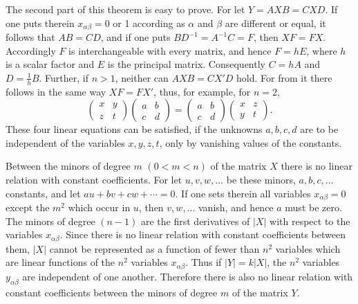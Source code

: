 \documentclass[11pt]{article}
\begin{document}
The second part of this theorem is easy to prove. For let $Y=AXB=CXD$. If one puts therein $x_{\alpha\beta}=0$ or 1 according as $\alpha$ and $\beta$ are different or equal, it follows that $AB=CD$, and if one puts $BD^{-1}=A^{-1}C=F$, then $XF=FX$. Accordingly $F$ is interchangeable with every matrix, and hence $F=hE$, where $h$ is a scalar factor and $E$ is the principal matrix. Consequently $C=hA$ and $D=\frac{1}{h}B$. Further, if $n>1$, neither can $AXB=CX'D$ hold. For from it there follows in the same way $XF=FX'$, thus, for example, for $n=2$,
\[
\begin{pmatrix}x&y\\z&t\end{pmatrix}
\begin{pmatrix}a&b\\c&d\end{pmatrix}
=\begin{pmatrix}a&b\\c&d\end{pmatrix}
\begin{pmatrix}x&z\\y&t\end{pmatrix}.
\]
These four linear equations can be satisfied, if the unknowns $a,b,c,d$ are to be independent of the variables $x,y,z,t$, only by vanishing values of the constants.

Between the minors of degree $m$ $(0<m<n)$ of the matrix $X$ there is no linear relation with constant coefficients. For let $u,v,w,\ldots$ be these minors, $a,b,c,\ldots$ constants, and let $au+bv+cw+\cdots=0$. If one sets therein all variables $x_{\alpha\beta}=0$ except the $m^2$ which occur in $u$, then $v,w,\ldots$ vanish, and hence $a$ must be zero. The minors of degree $(n-1)$ are the first derivatives of $|X|$ with respect to the variables $x_{\alpha\beta}$. Since there is no linear relation with constant coefficients between them, $|X|$ cannot be represented as a function of fewer than $n^2$ variables which are linear functions of the $n^2$ variables $x_{\alpha\beta}$. Thus if $|Y|=k|X|$, the $n^2$ variables $y_{\alpha\beta}$ are independent of one another. Therefore there is also no linear relation with constant coefficients between the minors of degree $m$ of the matrix $Y$.
\end{document}
